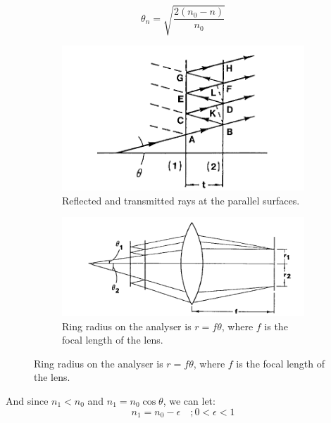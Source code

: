 \documentclass[a4paper,12pt]{article}
\begin{document}
\begin{equation}
    \theta_n = \sqrt{\frac{2(n_{0}-n)}{n_{0}}}
\end{equation}
\begin{figure}[H]
    \centering
    \begin{subfigure}[b]{0.45\textwidth}
        \centering
        \includegraphics[width=\textwidth]{fabry_perot_2.png}
        \caption{Reflected and transmitted rays at the parallel surfaces.}
        \label{fig:fabry_perot_interference}
    \end{subfigure}
    \hfill
    \begin{subfigure}[b]{0.45\textwidth}
            \centering
            \includegraphics[width=\textwidth]{fabry_perot_1.png}
            \caption{Ring radius on the analyser is $r = f\theta$, where $f$ is the focal length of the lens.}
            \label{fig:fabry_perot_focusing}
        \label{fig:fabry_perot_focusing}
    \end{subfigure}
    \label{fig:fabry_perot_diagram}
\end{figure}
\indent And since $n_1 < n_0$ and $n_1 = n_0 \cos \theta$, we can let:
\begin{equation}
    n_1 = n_0 - \epsilon \quad ; 0<\epsilon < 1
\end{equation}
\end{document}
